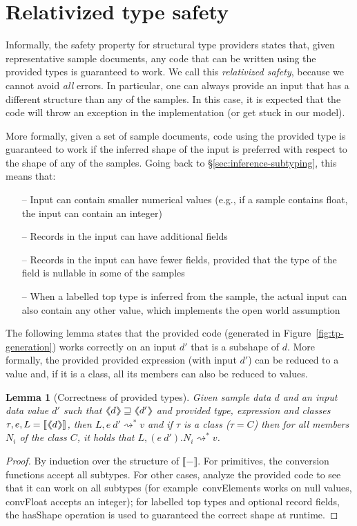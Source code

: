 \documentclass[10pt,preprint,blind,clearpagebib]{sigplanconf}
\newcommand{\langl}{\begin{picture}(4.5,7)
\put(1.1,2.5){\rotatebox{60}{\line(1,0){5.5}}}
\put(1.1,2.5){\rotatebox{300}{\line(1,0){5.5}}}
\end{picture}}
\newcommand{\rangl}{\begin{picture}(4.5,7)
\put(.9,2.5){\rotatebox{120}{\line(1,0){5.5}}}
\put(.9,2.5){\rotatebox{240}{\line(1,0){5.5}}}
\end{picture}}
\newcommand{\llangl}{\langl\hspace{-0.35em}\langl}
\newcommand{\rrangl}{\rangl\hspace{-0.35em}\rangl}
\newcommand{\kvd}[1]{\textnormal{\textcolor{kvdclr}{\sffamily #1}}}
\newcommand{\ident}[1]{\textnormal{\sffamily #1}}
\newcommand{\reduce}{\rightsquigarrow}
\newcommand{\sem}[1]{\llbracket #1 \rrbracket}
\newcommand{\semalt}[1]{\llangl #1 \rrangl}
\newtheorem{lemma}[theorem]{Lemma}
\begin{document}
\section{Relativized type safety}
\label{sec:safety}

Informally, the safety property for structural type providers states that, given representative sample
documents, any code that can be written using the provided types is guaranteed to work. We call this 
\emph{relativized safety}, because we cannot avoid \emph{all} errors. In particular, one can always
provide an input that has a different structure than any of the samples. In this case, it is expected 
that the code will throw an exception in the implementation (or get stuck in our model).

More formally, given a set of sample documents, code using the provided type is guaranteed to work if 
the inferred shape of the input is preferred with respect to the shape of any of the samples. Going back to 
\S\ref{sec:inference-subtyping}, this means that:
%
\begin{itemize}
\item[--] Input can contain smaller numerical values (e.g., if a sample contains float, the input can contain an integer)
\item[--] Records in the input can have additional fields
\item[--] Records in the input can have fewer fields, provided that the type of the field is nullable in some of the samples
\item[--] When a labelled top type is inferred from the sample, the actual input can also contain any other value,
  which implements the open world assumption  
\end{itemize}
%
The following lemma states that the provided code (generated in Figure~\ref{fig:tp-generation})
works correctly on an input $d'$ that is a subshape of $d$. More formally, the provided
provided expression (with input $d'$) can be reduced to a value and, if it is a class,
all its members can also be reduced to values.

\begin{lemma}[Correctness of provided types]
\label{thm:tp-correctness}
Given sample data $d$ and an input data value $d'$ such that $\semalt{d} \sqsupseteq \semalt{d'}$
and provided type, expression and classes $\tau, e, L = \sem{\semalt{d}}$, 
then $L, e~d' \reduce^{*} v$ and if $\tau$ is a class ($\tau=C$) then for all members $N_i$ of the 
class $C$, it holds that $L, (e~d').N_i \reduce^{*} v$.
\end{lemma}
\begin{proof}
By induction over the structure of $\sem{-}$. For primitives, the conversion functions accept all subtypes.
For other cases, analyze the provided code to see that it can work on all subtypes (for example~\ident{convElements}
works on \kvd{null} values, \ident{convFloat} accepts an integer); for labelled top types and
optional record fields, the \ident{hasShape} operation is used to guaranteed the correct shape at runtime.
\end{proof}
\end{document}
